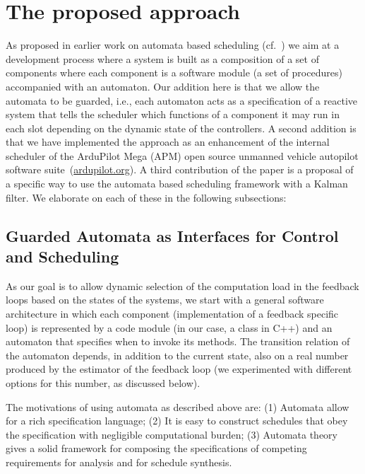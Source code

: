 \documentclass{sig-alternate-ipsn13}
\begin{document}
\section{The proposed approach}
\label{sec:architecture}

As proposed in earlier work on automata based scheduling (cf.~\cite{weiss2007automata,RTComposer,AW08}) we aim at a development process where a system is built as a composition of a set of components where each component is a software module (a set of procedures) accompanied with an automaton. Our addition here is that we allow the automata to be guarded, i.e., each automaton acts as a specification of a reactive system that tells the scheduler which functions of a component it may run in each slot depending on the dynamic state of the controllers. A second addition is that we have implemented the approach as an enhancement of the internal scheduler of the ArduPilot Mega (APM) open source unmanned vehicle autopilot software suite~(\url{ardupilot.org}). A third contribution of the paper is a proposal of a specific way to use the automata based scheduling framework with a Kalman filter. We elaborate on each of these in the following subsections:

\subsection{Guarded Automata as Interfaces for Control and Scheduling}
As our goal is to allow dynamic selection of the computation load in the feedback loops based on the states of the systems, we start with a general software architecture in which each component (implementation of a feedback specific loop) is represented by a code module (in our case, a class in C++) and an automaton that specifies when to invoke its methods. The transition relation of the automaton depends, in addition to the current state, also on a real number produced by the estimator of the feedback loop (we experimented with different options for this number, as discussed below).

The motivations of using automata as described above are: (1) Automata allow for a rich specification language; (2) It is easy to construct schedules that obey the specification with negligible computational burden; (3) Automata theory gives a solid framework for composing the specifications of competing requirements for analysis and for schedule synthesis. 
\end{document}
